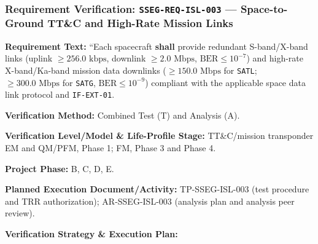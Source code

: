 \subsubsection{Requirement Verification: \texttt{SSEG-REQ-ISL-003} --- Space-to-Ground TT\&C and High-Rate Mission Links}
\label{ver:SSEG-REQ-ISL-003}
\textbf{Requirement Text:} ``Each spacecraft \textbf{shall} provide redundant S-band/X-band  links (uplink $\ge 256.0\text{ kbps}$, downlink $\ge 2.0\text{ Mbps}$, $\text{BER} \le 10^{-7}$) and high-rate X-band/Ka-band mission data downlinks ($\ge 150.0\text{ Mbps}$ for \texttt{SATL}; $\ge 300.0\text{ Mbps}$ for \texttt{SATG}, $\text{BER} \le 10^{-9}$) compliant with the applicable space data link protocol and \texttt{IF-EXT-01}.
\par\textbf{Verification Method:} Combined Test (T) and Analysis (A).
\par\textbf{Verification Level/Model \& Life-Profile Stage:} TT\&C/mission transponder EM and QM/PFM, Phase 1; FM, Phase 3 and Phase 4.
\par\textbf{Project Phase:} B, C, D, E.
\par\textbf{Planned Execution Document/Activity:} TP-SSEG-ISL-003 (test procedure and TRR authorization); AR-SSEG-ISL-003 (analysis plan and analysis peer review).
\par\textbf{Verification Strategy \& Execution Plan:}
